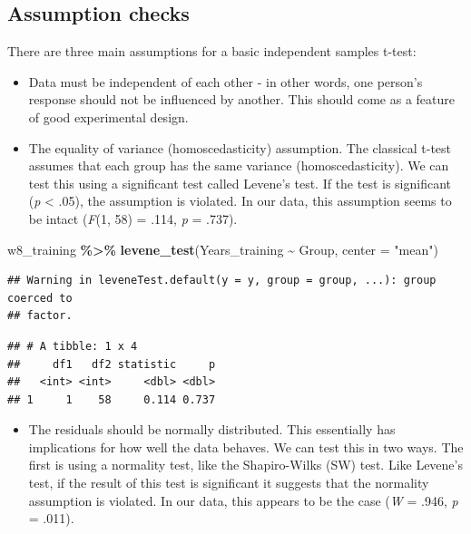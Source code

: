 \documentclass[
]{book}
\newenvironment{Shaded}{\begin{snugshade}}{\end{snugshade}}
\newcommand{\AttributeTok}[1]{\textcolor[rgb]{0.13,0.29,0.53}{#1}}
\newcommand{\FunctionTok}[1]{\textcolor[rgb]{0.13,0.29,0.53}{\textbf{#1}}}
\newcommand{\NormalTok}[1]{#1}
\newcommand{\SpecialCharTok}[1]{\textcolor[rgb]{0.81,0.36,0.00}{\textbf{#1}}}
\newcommand{\StringTok}[1]{\textcolor[rgb]{0.31,0.60,0.02}{#1}}
\providecommand{\tightlist}{%
  \setlength{\itemsep}{0pt}\setlength{\parskip}{0pt}}
\begin{document}
\subsection{Assumption checks}\label{assumption-checks-1}

There are three main assumptions for a basic independent samples t-test:

\begin{itemize}
\tightlist
\item
  Data must be independent of each other - in other words, one person's response should not be influenced by another. This should come as a feature of good experimental design.
\item
  The equality of variance (homoscedasticity) assumption. The classical t-test assumes that each group has the same variance (homoscedasticity). We can test this using a significant test called Levene's test. If the test is significant (\emph{p} \textless{} .05), the assumption is violated. In our data, this assumption seems to be intact (\emph{F}(1, 58) = .114, \emph{p} = .737).
\end{itemize}

\begin{Shaded}
\begin{Highlighting}[]
\NormalTok{w8\_training }\SpecialCharTok{\%\textgreater{}\%}
  \FunctionTok{levene\_test}\NormalTok{(Years\_training }\SpecialCharTok{\textasciitilde{}}\NormalTok{ Group, }\AttributeTok{center =} \StringTok{"mean"}\NormalTok{)}
\end{Highlighting}
\end{Shaded}

\begin{verbatim}
## Warning in leveneTest.default(y = y, group = group, ...): group coerced to
## factor.
\end{verbatim}

\begin{verbatim}
## # A tibble: 1 x 4
##     df1   df2 statistic     p
##   <int> <int>     <dbl> <dbl>
## 1     1    58     0.114 0.737
\end{verbatim}

\begin{itemize}
\tightlist
\item
  The residuals should be normally distributed. This essentially has implications for how well the data behaves. We can test this in two ways. The first is using a normality test, like the Shapiro-Wilks (SW) test. Like Levene's test, if the result of this test is significant it suggests that the normality assumption is violated. In our data, this appears to be the case (\emph{W} = .946, \emph{p} = .011).
\end{itemize}
\end{document}
